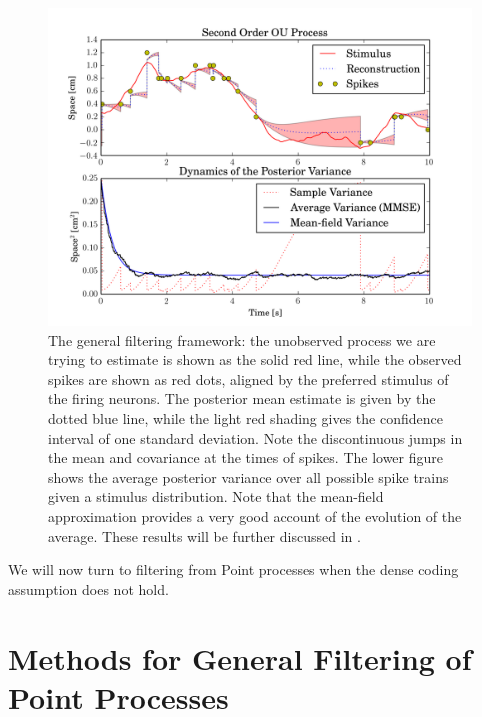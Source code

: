 \begin{figure}
\label{fig:matern_coding}
\includegraphics[width=\columnwidth]{figures/matern_coding.png}
\caption{The general filtering framework: the unobserved process we are trying to estimate is shown as the solid red line, while the observed spikes are
shown as red dots, aligned by the preferred stimulus of the firing neurons. The posterior mean estimate is given by the dotted blue line, while the light red shading
gives the confidence interval of one standard deviation. Note the discontinuous jumps in the mean and covariance at the times of spikes. The lower figure shows the
average posterior variance over all possible spike trains given a stimulus distribution. Note that the mean-field approximation provides a very good account of the
evolution of the average. These results will be further discussed in .}
\end{figure}

We will now turn to filtering from Point processes when the dense coding assumption does not hold.

\section{Methods for General Filtering of Point Processes}

